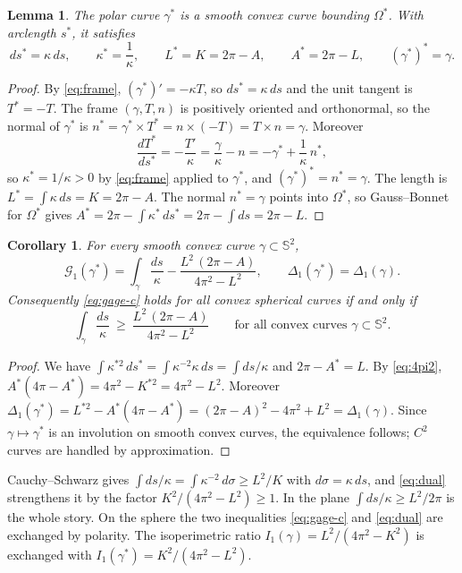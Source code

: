 \documentclass[11pt]{amsart}
\newtheorem{lemma}[theorem]{Lemma}
\newtheorem{corollary}[theorem]{Corollary}
\theoremstyle{definition}
\theoremstyle{remark}
\numberwithin{equation}{section}
\newcommand{\Sph}{\mathbb{S}}
\newcommand{\G}{\mathcal{G}}
\begin{document}
\begin{lemma}\label{lem:polarity}
The polar curve $\gamma^*$ is a smooth convex curve bounding $\Omega^*$. With arclength $s^*$, it satisfies
\[
ds^*=\kappa\,ds,\qquad \kappa^*=\frac1\kappa,\qquad L^*=K=2\pi-A,\qquad A^*=2\pi-L,\qquad (\gamma^*)^*=\gamma .
\]
\end{lemma}

\begin{proof}
By \eqref{eq:frame}, $(\gamma^*)'=-\kappa T$, so $ds^*=\kappa\,ds$ and the unit tangent is $T^*=-T$. The frame $(\gamma,T,n)$ is positively oriented and orthonormal, so the normal of $\gamma^*$ is $n^*=\gamma^*\times T^*=n\times(-T)=T\times n=\gamma$. Moreover
\[
\frac{dT^*}{ds^*}=-\frac{T'}{\kappa}=\frac{\gamma}{\kappa}-n=-\gamma^*+\frac1\kappa\,n^*,
\]
so $\kappa^*=1/\kappa>0$ by \eqref{eq:frame} applied to $\gamma^*$, and $(\gamma^*)^*=n^*=\gamma$. The length is $L^*=\int\kappa\,ds=K=2\pi-A$. The normal $n^*=\gamma$ points into $\Omega^*$, so Gauss--Bonnet for $\Omega^*$ gives $A^*=2\pi-\int\kappa^*\,ds^*=2\pi-\int ds=2\pi-L$.
\end{proof}

\begin{corollary}\label{cor:dual}
For every smooth convex curve $\gamma\subset\Sph^2$,
\[
\G_1(\gamma^*)=\int_\gamma\frac{ds}{\kappa}-\frac{L^2\,(2\pi-A)}{4\pi^2-L^2},\qquad \Delta_1(\gamma^*)=\Delta_1(\gamma).
\]
Consequently \eqref{eq:gage-c} holds for all convex spherical curves if and only if
\begin{equation}\label{eq:dual}
\int_\gamma\frac{ds}{\kappa}\ \ge\ \frac{L^2\,(2\pi-A)}{4\pi^2-L^2}\qquad\text{for all convex curves }\gamma\subset\Sph^2 .
\end{equation}
\end{corollary}

\begin{proof}
We have $\int\kappa^{*2}\,ds^*=\int\kappa^{-2}\kappa\,ds=\int ds/\kappa$ and $2\pi-A^*=L$. By \eqref{eq:4pi2}, $A^*(4\pi-A^*)=4\pi^2-K^{*2}=4\pi^2-L^2$. Moreover $\Delta_1(\gamma^*)=L^{*2}-A^*(4\pi-A^*)=(2\pi-A)^2-4\pi^2+L^2=\Delta_1(\gamma)$. Since $\gamma\mapsto\gamma^*$ is an involution on smooth convex curves, the equivalence follows; $C^2$ curves are handled by approximation.
\end{proof}

Cauchy--Schwarz gives $\int ds/\kappa=\int\kappa^{-2}\,d\sigma\ge L^2/K$ with $d\sigma=\kappa\,ds$, and \eqref{eq:dual} strengthens it by the factor $K^2/(4\pi^2-L^2)\ge1$. In the plane $\int ds/\kappa\ge L^2/2\pi$ is the whole story. On the sphere the two inequalities \eqref{eq:gage-c} and \eqref{eq:dual} are exchanged by polarity. The isoperimetric ratio $I_1(\gamma)=L^2/(4\pi^2-K^2)$ is exchanged with $I_1(\gamma^*)=K^2/(4\pi^2-L^2)$.
\end{document}
